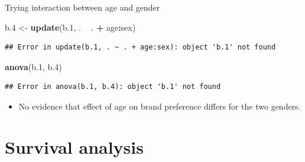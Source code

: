 \documentclass[ignorenonframetext,]{beamer}
\newenvironment{Shaded}{\begin{snugshade}}{\end{snugshade}}
\newcommand{\FloatTok}[1]{\textcolor[rgb]{0.00,0.00,0.81}{#1}}
\newcommand{\KeywordTok}[1]{\textcolor[rgb]{0.13,0.29,0.53}{\textbf{#1}}}
\newcommand{\NormalTok}[1]{#1}
\newcommand{\OperatorTok}[1]{\textcolor[rgb]{0.81,0.36,0.00}{\textbf{#1}}}
\newcommand{\StringTok}[1]{\textcolor[rgb]{0.31,0.60,0.02}{#1}}
\providecommand{\tightlist}{%
  \setlength{\itemsep}{0pt}\setlength{\parskip}{0pt}}
\begin{document}
\begin{frame}[fragile]{Trying interaction between age and gender}
\protect\hypertarget{trying-interaction-between-age-and-gender}{}

\scriptsize

\begin{Shaded}
\begin{Highlighting}[]
\NormalTok{b}\FloatTok{.4}\NormalTok{ <-}\StringTok{ }\KeywordTok{update}\NormalTok{(b}\FloatTok{.1}\NormalTok{, . }\OperatorTok{~}\StringTok{ }\NormalTok{. }\OperatorTok{+}\StringTok{ }\NormalTok{age}\OperatorTok{:}\NormalTok{sex)}
\end{Highlighting}
\end{Shaded}

\begin{verbatim}
## Error in update(b.1, . ~ . + age:sex): object 'b.1' not found
\end{verbatim}

\begin{Shaded}
\begin{Highlighting}[]
\KeywordTok{anova}\NormalTok{(b}\FloatTok{.1}\NormalTok{, b}\FloatTok{.4}\NormalTok{)}
\end{Highlighting}
\end{Shaded}

\begin{verbatim}
## Error in anova(b.1, b.4): object 'b.1' not found
\end{verbatim}

\normalsize

\begin{itemize}
\tightlist
\item
  No evidence that effect of age on brand preference differs for the two
  genders.
\end{itemize}

\end{frame}

\hypertarget{survival-analysis}{%
\section{Survival analysis}\label{survival-analysis}}
\end{document}
